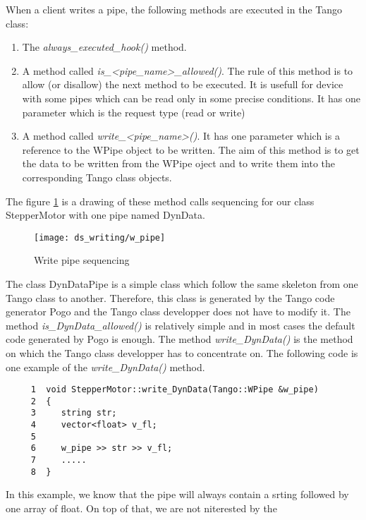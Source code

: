 When a client writes a pipe, the following methods are executed in
the Tango class:
\begin{enumerate}
\item The \emph{always\_executed\_hook()} method.
\item A method called \emph{is\_<pipe\_name>\_allowed()}. The rule of this
method is to allow (or disallow) the next method to be executed. It
is usefull for device with some pipes which can be read only in some
precise conditions. It has one parameter which is the request type
(read or write)
\item A method called \emph{write\_<pipe\_name>()}. It has one parameter
which is a reference to the WPipe object to be written. The aim of
this method is to get the data to be written from the WPipe oject
and to write them into the corresponding Tango class objects.
\end{enumerate}
The figure \ref{w_pipe_timing_fig-1-1} is a drawing of these method
calls sequencing for our class StepperMotor with one pipe named DynData.
\begin{figure}[H]
\begin{centering}
\texttt{[image: ds\_writing/w\_pipe]}
\par\end{centering}

\protect\caption{Write pipe sequencing}
\label{w_pipe_timing_fig-1-1}
\end{figure}


The class DynDataPipe is a simple class which follow the same skeleton
from one Tango class to another. Therefore, this class is generated
by the Tango code generator Pogo and the Tango class developper does
not have to modify it. The method \emph{is\_DynData\_allowed()} is
relatively simple and in most cases the default code generated by
Pogo is enough. The method \emph{write\_DynData()} is the method on
which the Tango class developper has to concentrate on. The following
code is one example of the \emph{write\_DynData()} method.


\begin{verbatim}
     1  void StepperMotor::write_DynData(Tango::WPipe &w_pipe)
     2  {
     3     string str;
     4     vector<float> v_fl;
     5
     6     w_pipe >> str >> v_fl;
     7     .....
     8  }
\end{verbatim}


In this example, we know that the pipe will always contain a srting
followed by one array of float. On top of that, we are not niterested
by the

